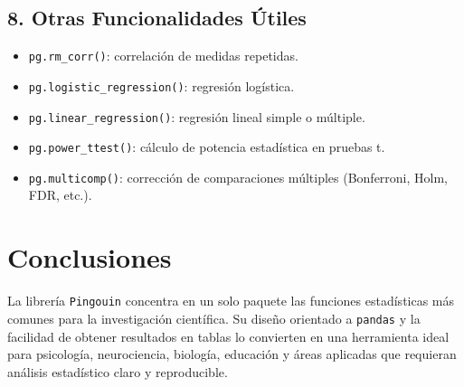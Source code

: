 \documentclass[12pt,a4paper]{article}
\begin{document}
\subsection{8. Otras Funcionalidades Útiles}
\begin{itemize}
    \item \texttt{pg.rm\_corr()}: correlación de medidas repetidas.
    \item \texttt{pg.logistic\_regression()}: regresión logística.
    \item \texttt{pg.linear\_regression()}: regresión lineal simple o múltiple.
    \item \texttt{pg.power\_ttest()}: cálculo de potencia estadística en pruebas t.
    \item \texttt{pg.multicomp()}: corrección de comparaciones múltiples (Bonferroni, Holm, FDR, etc.).
\end{itemize}

\section{Conclusiones}
La librería \texttt{Pingouin} concentra en un solo paquete las funciones estadísticas más comunes para la investigación científica. Su diseño orientado a \texttt{pandas} y la facilidad de obtener resultados en tablas lo convierten en una herramienta ideal para psicología, neurociencia, biología, educación y áreas aplicadas que requieran análisis estadístico claro y reproducible.
\end{document}
